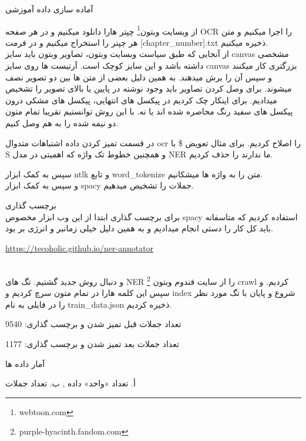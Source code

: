 


\huge{آماده سازی داده آموزشی}\\
\large


از وبسایت وبتون\footnote{webtoon.com} چپتر هارا دانلود میکنیم و در هر صفحه OCR را اجرا میکنیم و متن هر چپتر را استخراج میکنیم و در فرمت  [chapter\_number].txt ذخیره میکنیم.
\\
از آنجایی که طبق سیاست وبسایت وبتون، تصاویر وبتون باید سایز canvas
مشخصی داشته باشد و این سایز کوچک است.
آرتیست ها روی سایز canvas بزرگتری کار میکنند
و سپس آن را برش میدهند. به همین دلیل بعضی از متن ها بین دو تصویر نصف میشوند.
برای وصل کردن تصاویر باید وجود نوشته در پایین یا بالای تصویر را تشخیص میدادیم.
برای اینکار چک کردیم در پیکسل های انتهایی، پیکسل های مشکی درون پیکسل های سفید رنگ محاصره شده اند یا نه. با این روش توانستیم تقریبا تمام متون دو نیمه شده را به هم وصل کنیم.

در قسمت تمیز کردن داده اشتباهات متدوال ocr را اصلاح کردیم.
برای مثال تعویض \$ با S
و همچنین خطوط تک واژه که اهمیتی در مدل NER ما ندارند را حذف کردیم.


سپس به کمک ابزار ntlk و تابع word\_tokenize متن را به واژه ها میشکانیم.
\\
و سپس به کمک ابزار 
spacy
جملات را تشخیص میدهیم.

\huge{برچسب گذاری}\\
\large
برای برچسب گذاری ابتدا از این وب ابزار مخصوص spacy استفاده کردیم
که متاسفانه باید کل کار را دستی انجام میدادیم و به همین دلیل خیلی زمانبر و انرژی بر بود.
 \begin{latin}
 \url{https://tecoholic.github.io/ner-annotator}
 \end{latin}
\\

و دنبال روش جدید گشتیم.
تگ های NER را از سایت فندوم وبتون \footnote{purple-hyacinth.fandom.com} crawl کردیم.
و سپس این کلمه هارا در تمام متون سرچ کردیم و index شروع و پایان با تگ مورد نظر 
را در فایلی به نام train\_data.json ذخیره کردیم.

تعداد جملات قبل تمیز شدن و برچسب گذاری: 9540

تعداد جملات بعد تمیز شدن و برچسب گذاری: 1177


\huge{آمار داده ها}\\
\large



أ. تعداد «واحد» داده , ب. تعداد جملات
\begin{latin}
\begin{center}
  \fontsize{8pt}{9pt}\ttfamily
\end{center}
\end{latin}

